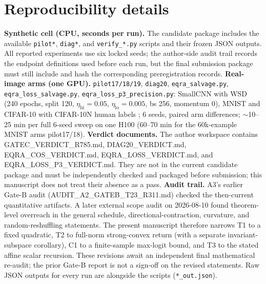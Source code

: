 \documentclass{article}
\begin{document}
\section{Reproducibility details}
\label{app:repro}
\textbf{Synthetic cell (CPU, seconds per run).} The candidate package includes the available
\texttt{pilot*}, \texttt{diag*}, and \texttt{verify\_*.py} scripts and their frozen JSON
outputs. All reported experiments use six locked seeds; the author-side audit trail records the
endpoint definitions used before each run, but the final submission package must still include
and hash the corresponding preregistration records. \textbf{Real-image arms (one GPU).}
\texttt{pilot17/18/19}, \texttt{diag20}, \texttt{eqra\_salvage.py},
\texttt{eqra\_loss\_salvage.py}, \texttt{eqra\_loss\_p3\_precision.py}: SmallCNN with WSD
(240 epochs, split 120, $\eta_{\mathrm{hi}}{=}0.05$, $\eta_{\mathrm{lo}}{=}0.005$, bs 256,
momentum 0), MNIST and CIFAR-10 with CIFAR-10N human labels \citep{wei2022cifar10n}; 6 seeds,
paired arm differences; $\sim$10--25 min per full 6-seed sweep on one H100 (60--70 min for the 60k-example MNIST arms pilot17/18). \textbf{Verdict
documents.} The author workspace contains GATEC\_VERDICT\_R785.md, DIAG20\_VERDICT.md,
EQRA\_COS\_VERDICT.md, EQRA\_LOSS\_VERDICT.md, and EQRA\_LOSS\_P3\_VERDICT.md. They are not
in the current candidate package and must be independently checked and packaged before
submission; this manuscript does not treat their absence as a pass. \textbf{Audit trail.} A3's earlier Gate-B audit
(AUDIT\_A2\_GATEB\_T23\_R311.md) checked the then-current quantitative artifacts. A later
external scope audit on 2026-08-10 found theorem-level overreach in the general schedule,
directional-contraction, curvature, and random-reshuffling statements. The present manuscript
therefore narrows T1 to a fixed quadratic, T2 to full-norm strong-convex return (with a separate
invariant-subspace corollary), C1 to a finite-sample max-logit bound, and T3 to the stated affine
scalar recursion. These revisions await an independent final mathematical re-audit; the prior
Gate-B report is not a sign-off on the revised statements. Raw JSON outputs for every run are
alongside the scripts (\texttt{*\_out.json}).
\end{document}
